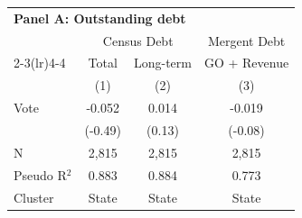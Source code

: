 \begingroup
\centering
\begin{tabular*}{\textwidth}{@{\extracolsep{\fill}}lccc}
\multicolumn{3}{l}{\textbf{Panel A: Outstanding debt}}\\

\addlinespace
   \toprule
                & \multicolumn{2}{c}{Census Debt} & \multicolumn{1}{c}{Mergent Debt}\\  
   \cmidrule(lr){2-3}\cmidrule(lr){4-4}
                & Total             & Long-term             & GO + Revenue \\   
                & (1)               & (2)                   & (3)\\  
   \midrule 
   Vote         & -0.052            & 0.014                 & -0.019\\   
                & (-0.49)          & (0.13)               & (-0.08)\\   
   \hline
   N & 2,815             & 2,815                 & 2,815\\  
   Pseudo R$^2$ & 0.883             & 0.884                 & 0.773\\  
   Cluster              & State & State & State\\  
   \bottomrule
\end{tabular*}
\par\endgroup
